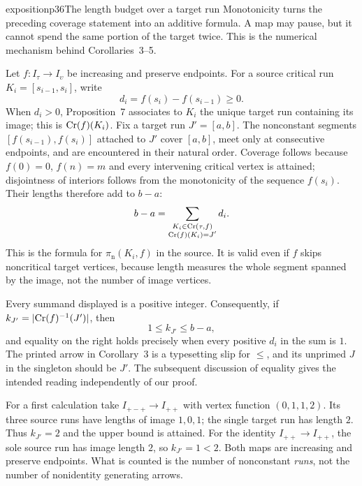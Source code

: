 \begin{dcomment}{exposition}{p36}{The length budget over a target run}
Monotonicity turns the preceding coverage statement into an additive formula. A map may pause, but it cannot spend the same portion of the target twice. This is the numerical mechanism behind Corollaries~3--5.

Let $f:I_\tau\to I_\upsilon$ be increasing and preserve endpoints. For a source critical run $K_i=[s_{i-1},s_i]$, write
\[
 d_i=f(s_i)-f(s_{i-1})\geq0.
\]
When $d_i>0$, Proposition~7 associates to $K_i$ the unique target run containing its image; this is $\mathrm{Cr}(f)(K_i)$. Fix a target run $J'=[a,b]$. The nonconstant segments $[f(s_{i-1}),f(s_i)]$ attached to $J'$ cover $[a,b]$, meet only at consecutive endpoints, and are encountered in their natural order. Coverage follows because $f(0)=0$, $f(n)=m$ and every intervening critical vertex is attained; disjointness of interiors follows from the monotonicity of the sequence $f(s_i)$. Their lengths therefore add to $b-a$:
\[
 b-a=\sum_{\substack{K_i\in\mathrm{Cr}(\tau,f)\\\mathrm{Cr}(f)(K_i)=J'}}d_i.
\]
This is the formula for $\pi_{\mathrm n}(K_i,f)$ in the source. It is valid even if $f$ skips noncritical target vertices, because length measures the whole segment spanned by the image, not the number of image vertices.

Every summand displayed is a positive integer. Consequently, if $k_{J'}=|\mathrm{Cr}(f)^{-1}(J')|$, then
\[
 1\leq k_{J'}\leq b-a,
\]
and equality on the right holds precisely when every positive $d_i$ in the sum is $1$. The printed arrow in Corollary~3 is a typesetting slip for $\leq$, and its unprimed $J$ in the singleton should be $J'$. The subsequent discussion of equality gives the intended reading independently of our proof.

For a first calculation take $I_{+-+}\to I_{++}$ with vertex function $(0,1,1,2)$. Its three source runs have lengths of image $1,0,1$; the single target run has length $2$. Thus $k_{J'}=2$ and the upper bound is attained. For the identity $I_{++}\to I_{++}$, the sole source run has image length $2$, so $k_{J'}=1<2$. Both maps are increasing and preserve endpoints. What is counted is the number of nonconstant \emph{runs}, not the number of nonidentity generating arrows.


\end{dcomment}

